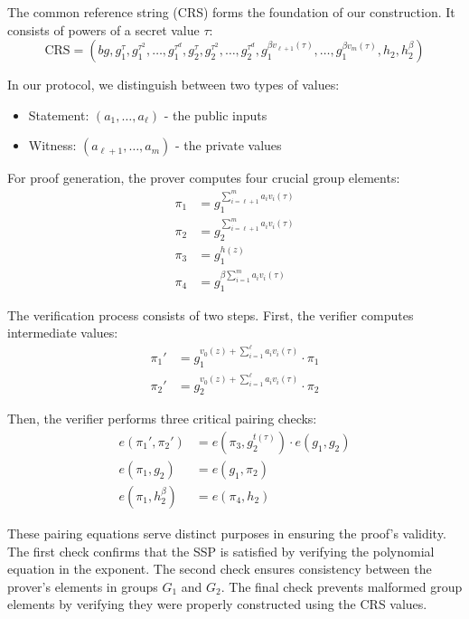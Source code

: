 The common reference string (CRS) forms the foundation of our construction. It consists of powers of a secret value $\tau$:
\[ \text{CRS} = (bg, g_1^\tau, g_1^{\tau^2}, \dots, g_1^{\tau^d}, g_2^\tau, g_2^{\tau^2}, \dots, g_2^{\tau^d}, g_1^{\beta v_{\ell + 1}(\tau)}, \dots, g_1^{\beta v_m(\tau)}, h_2, h_2^\beta) \]

In our protocol, we distinguish between two types of values:
\begin{itemize}
    \item Statement: $(a_1, \dots, a_\ell)$ - the public inputs
    \item Witness: $(a_{\ell+1}, \dots, a_m)$ - the private values
\end{itemize}

For proof generation, the prover computes four crucial group elements:
\begin{align*}
    \pi_1 &= g_1^{\sum_{i=\ell+1}^m a_i v_i(\tau)} \\
    \pi_2 &= g_2^{\sum_{i=\ell+1}^m a_i v_i(\tau)} \\
    \pi_3 &= g_1^{h(z)} \\
    \pi_4 &= g_1^{\beta \sum_{i=1}^m a_i v_i(\tau)}
\end{align*}

The verification process consists of two steps. First, the verifier computes intermediate values:
\begin{align*}
    \pi_1' &= g_1^{v_0(z) + \sum_{i=1}^\ell a_i v_i(\tau)} \cdot \pi_1 \\
    \pi_2' &= g_2^{v_0(z) + \sum_{i=1}^\ell a_i v_i(\tau)} \cdot \pi_2
\end{align*}

Then, the verifier performs three critical pairing checks:
\begin{align*}
    e(\pi_1', \pi_2') &= e(\pi_3, g_2^{t(\tau)}) \cdot e(g_1, g_2) \\
    e(\pi_1, g_2) &= e(g_1, \pi_2) \\
    e(\pi_1, h_2^\beta) &= e(\pi_4, h_2)
\end{align*}

These pairing equations serve distinct purposes in ensuring the proof's validity. The first check confirms that the SSP is satisfied by verifying the polynomial equation in the exponent. The second check ensures consistency between the prover's elements in groups $G_1$ and $G_2$. The final check prevents malformed group elements by verifying they were properly constructed using the CRS values.

